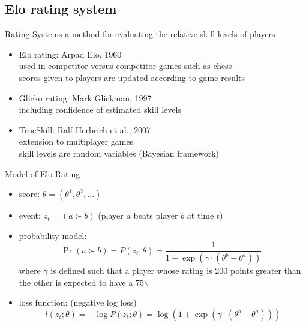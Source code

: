 \documentclass[fleqn,aspectratio=1610]{beamer}
\begin{document}
\subsection{Elo rating system}
\label{sec:org51446ef}
\begin{frame}[label={sec:orgdbb49df}]{Rating Systems}
a method for evaluating the relative skill levels of players
\begin{itemize}
\item Elo rating: Arpad Elo, 1960\\
used in competitor-versus-competitor games such as chess\\
scores given to players are updated according to game results
\item Glicko rating: Mark Glickman, 1997\\
including confidence of estimated skill levels
\item TrueSkill: Ralf Herbrich et al., 2007\\
extension to multiplayer games\\
skill levels are random variables (Bayesian framework)
\end{itemize}
\end{frame}
\begin{frame}[label={sec:orgec2f6f6}]{Model of Elo Rating}
\begin{itemize}
\item score: \(\theta=(\theta^{1},\theta^{2},\dotsc)\)
\item event: \(z_{t}=(a\succ b)\) (player \(a\) beats player \(b\) at time \(t\))
\item probability model: 
\begin{equation}
  \Pr(a\succ b)
  =P(z_{t};\theta)
  =\frac{1}{1+\exp(\gamma\cdot(\theta^{b}-\theta^{a}))},
\end{equation}
where \(\gamma\) is defined such that
a player whose rating is 200 points greater than the other
is expected to have a 75$\backslash$%
\item loss function: (negative log loss)
\begin{equation}
  l(z_{t};\theta)
  =-\log P(z_{t};\theta)
  =\log(1+\exp(\gamma\cdot(\theta^{b}-\theta^{a})))
\end{equation}
\end{itemize}
\end{frame}
\end{document}
